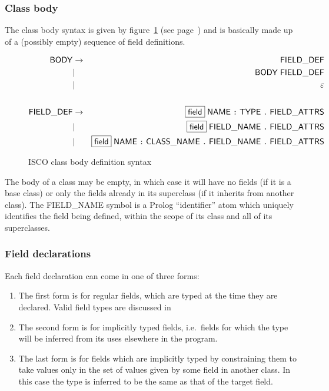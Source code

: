 \subsubsection{Class body}
\label{sec:syntax:class-body}

The class body syntax is given by figure~\ref{fig:syntax:class-body} (see
page~\pageref{fig:syntax:class-body}) and is basically made up of a (possibly
empty) sequence of field definitions.
\begin{figure}[htb]
  \centering
  \begin{eqnarray*}
    \mathsf{BODY} & \rightarrow & \mathsf{FIELD\_DEF} \\
    & | & \mathsf{BODY} \; \mathsf{FIELD\_DEF} \\
    & | & \varepsilon \\
    \\
    \mathsf{FIELD\_DEF} & \rightarrow & \fbox{\textsf{field}} \;
    \mathsf{NAME} \;\texttt{:}\; \mathsf{TYPE} \;\texttt{.}\; \mathsf{FIELD\_ATTRS} \\
    & | &  \fbox{\textsf{field}} \; \mathsf{FIELD\_NAME} \;\texttt{.}\;
    \mathsf{FIELD\_ATTRS} \\
    & | &  \fbox{\textsf{field}} \; \mathsf{NAME} \;\texttt{:}\; \mathsf{CLASS\_NAME}
    \;\texttt{.}\; \mathsf{FIELD\_NAME} \;\texttt{.}\; \mathsf{FIELD\_ATTRS} \\
  \end{eqnarray*}
  \caption{ISCO class body definition syntax}
  \label{fig:syntax:class-body}
\end{figure}
The body of a class may be empty, in which case it will have no fields (if it
is a base class) or only the fields already in its superclass (if it inherits
from another class).  The \textsf{FIELD\_NAME} symbol is a Prolog
``identifier'' atom which uniquely identifies the field being defined, within
the scope of its class and all of its superclasses.


\subsubsection{Field declarations}
\label{sec:syntax:field-declarations}

Each field declaration can come in one of three forms:
\begin{enumerate}
\item The first form is for regular fields, which are typed at the time they
  are declared.  Valid field types are discussed in \TBD
\item The second form is for implicitly typed fields, i.e.~fields for which
  the type will be inferred from its uses elsewhere in the program.
\item The last form is for fields which are implicitly typed by constraining
  them to take values only in the set of values given by some field in another
  class.  In this case the type is inferred to be the same as that of the
  target field.
\end{enumerate}

